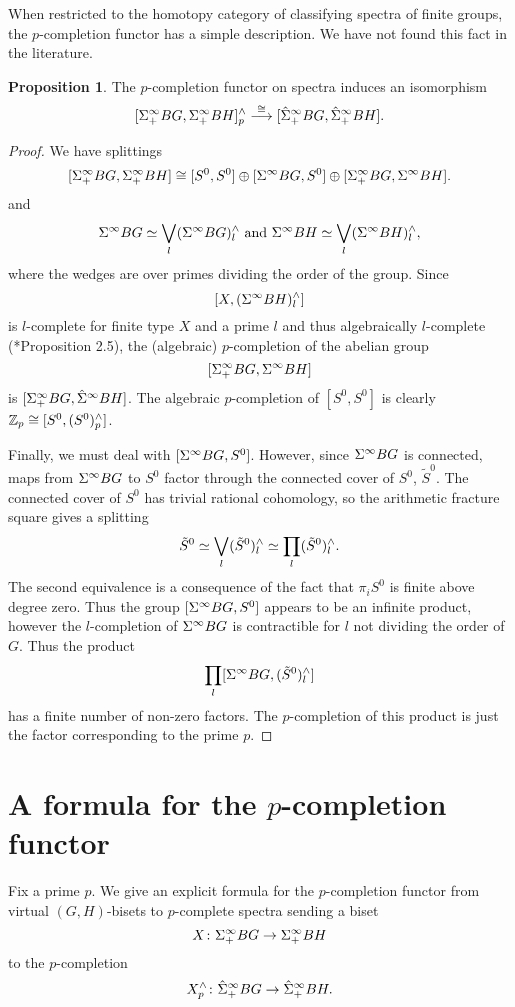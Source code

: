 \documentclass[10pt]{amsart}
\theoremstyle{definition}
\newtheorem{proposition}[theorem]{Proposition}
\begin{document}
When restricted to the homotopy category of classifying spectra of finite groups, the $p$-completion functor has a simple description. We have not found this fact in the literature.

\begin{proposition} \label{algebraic}
The $p$-completion functor on spectra induces an isomorphism
\[
[\Sigma^{\infty}_{+} BG, \Sigma^{\infty}_{+} BH]^{\wedge}_{p} \overset{\cong}{\longrightarrow} [\hat{\Sigma}^{\infty}_{+} BG, \hat{\Sigma}^{\infty}_{+} BH].
\]
\end{proposition}
\begin{proof}
We have splittings
\[
[\Sigma^{\infty}_{+} BG, \Sigma^{\infty}_{+} BH] \cong [S^0, S^0] \oplus [\Sigma^{\infty} BG, S^0] \oplus [\Sigma^{\infty}_{+} BG, \Sigma^{\infty} BH].
\]
and
\[
\Sigma^{\infty} BG \simeq \bigvee_{l} (\Sigma^{\infty} BG)^{\wedge}_{l} \text{ and } \Sigma^{\infty} BH \simeq \bigvee_{l} (\Sigma^{\infty} BH)^{\wedge}_{l},
\]
where the wedges are over primes dividing the order of the group. Since
\[
[X, (\Sigma^{\infty} BH)^{\wedge}_{l}]
\]
is $l$-complete for finite type $X$ and a prime $l$ and thus algebraically $l$-complete (\cite{Bousfield2}*{Proposition 2.5}), the (algebraic) $p$-completion of the abelian group
\[
[\Sigma^{\infty}_{+} BG, \Sigma^{\infty} BH]
\]
is $[\Sigma^{\infty}_{+} BG, \hat{\Sigma}^{\infty} BH]$.
The algebraic $p$-completion of $[S^0,S^0]$ is clearly $\mathbb{Z}_p \cong [S^0, (S^0)^{\wedge}_{p}]$.

Finally, we must deal with $[\Sigma^{\infty} BG, S^0]$. However, since $\Sigma^{\infty} BG$ is connected, maps from $\Sigma^{\infty} BG$ to $S^0$ factor through the connected cover of $S^0$, $\tilde{S}^0$. The connected cover of $S^0$ has trivial rational cohomology, so the arithmetic fracture square gives a splitting
\[
\tilde{S}^0 \simeq \bigvee_{l} (\tilde{S}^0)^{\wedge}_{l} \simeq \underset{l}{\prod} (\tilde{S}^0)^{\wedge}_{l}.
\]
The second equivalence is a consequence of the fact that $\pi_i S^0$ is finite above degree zero. Thus the group $[\Sigma^{\infty} BG, S^0]$ appears to be an infinite product, however the $l$-completion of $\Sigma^{\infty} BG$ is contractible for $l$ not dividing the order of $G$. Thus the product
\[
\underset{l}{\prod} [\Sigma^{\infty} BG, (\tilde{S}^0)^{\wedge}_{l}]
\]
has a finite number of non-zero factors. The $p$-completion of this product is just the factor corresponding to the prime $p$.
\end{proof}



\section{A formula for the $p$-completion functor}\label{secAFormulaForPCompletion}
Fix a prime $p$. We give an explicit formula for the $p$-completion functor from virtual $(G,H)$-bisets to $p$-complete spectra sending a biset
\[
X \colon \Sigma^{\infty}_{+} BG \rightarrow \Sigma^{\infty}_{+} BH
\]
to the $p$-completion
\[
X^{\wedge}_{p} \colon \hat{\Sigma}^{\infty}_{+} BG \rightarrow \hat{\Sigma}^{\infty}_{+} BH.
\]
\end{document}
